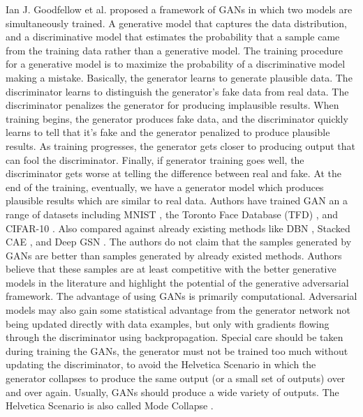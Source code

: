 Ian J. Goodfellow et al.\cite{goodfellow2014generative} proposed a framework of \acp{GAN} in which two models are simultaneously trained. A generative model that captures the data distribution, and a discriminative model that estimates the probability that a sample came from the training data rather than a generative model. The training procedure for a generative model is to maximize the probability of a discriminative model making a mistake. Basically, the generator learns to generate plausible data. The discriminator learns to distinguish the generator's fake data from real data. The discriminator penalizes the generator for producing implausible results. When training begins, the generator produces fake data, and the discriminator quickly learns to tell that it's fake and the generator penalized to produce plausible results. As training progresses, the generator gets closer to producing output that can fool the discriminator. Finally, if generator training goes well, the discriminator gets worse at telling the difference between real and fake. At the end of the training, eventually, we have a generator model which produces plausible results which are similar to real data. Authors have trained \ac{GAN} an a range of datasets including MNIST \cite{726791}, the Toronto Face Database (TFD) \cite{susskind2010toronto}, and CIFAR-10 \cite{krizhevsky2009learning}. Also compared against already existing methods like DBN \cite{bengio2012better}, Stacked CAE \cite{bengio2012better}, and Deep GSN \cite{bengio2014deep} . The authors do not claim that the samples generated by \acp{GAN} are better than samples generated by already existed methods. Authors believe that these samples are at least competitive with the better generative models in the literature and highlight the potential of the generative adversarial framework. The advantage of using \acp{GAN} is primarily computational. Adversarial models may also gain some statistical advantage from the generator network not being updated directly with data examples, but only with gradients flowing through the discriminator using backpropagation. Special care should be taken during training the \acp{GAN}, the generator must not be trained too much without updating the discriminator, to avoid the Helvetica Scenario \cite{manisha2019generative} in which the generator collapses to produce the same output (or a small set of outputs) over and over again. Usually, \acp{GAN} should produce a wide variety of outputs. The Helvetica Scenario is also called Mode Collapse \cite{thanhtung2020catastrophic}.

